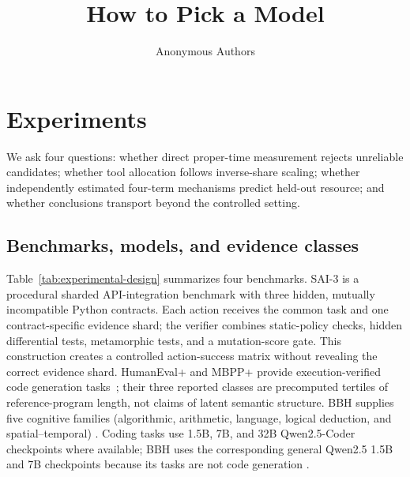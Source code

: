 \documentclass{article}
\title{How to Pick a Model}
\author{Anonymous Authors}
\theoremstyle{definition}
\theoremstyle{plain}
\theoremstyle{remark}
\newcounter{algorithm}
\begin{document}
\maketitle



\section{Experiments}
\label{sec:experiments}

We ask four questions: whether direct proper-time measurement rejects
unreliable candidates; whether tool allocation follows inverse-share
scaling; whether independently estimated four-term mechanisms predict held-out
resource; and whether conclusions transport beyond the controlled setting.

\subsection{Benchmarks, models, and evidence classes}

Table~\ref{tab:experimental-design} summarizes four benchmarks.  SAI-3 is a
procedural sharded API-integration benchmark with three hidden, mutually
incompatible Python contracts.  Each action receives the common task and one
contract-specific evidence shard; the verifier combines static-policy checks,
hidden differential tests, metamorphic tests, and a mutation-score gate.  This
construction creates a controlled action-success matrix without revealing the
correct evidence shard.  HumanEval+ and MBPP+ provide execution-verified code
generation tasks~\citep{chen2021humaneval,liu2023evalplus,austin2021mbpp}; their
three reported classes are precomputed tertiles of reference-program length,
not claims of latent semantic structure.  BBH supplies five cognitive families
(algorithmic, arithmetic, language, logical deduction, and spatial--temporal)
\citep{suzgun2023bbh}.  Coding tasks use 1.5B, 7B, and 32B Qwen2.5-Coder
checkpoints where available; BBH uses the corresponding general Qwen2.5 1.5B
and 7B checkpoints because its tasks are not code generation
\citep{hui2024qwen25coder,yang2024qwen25}.
\end{document}
